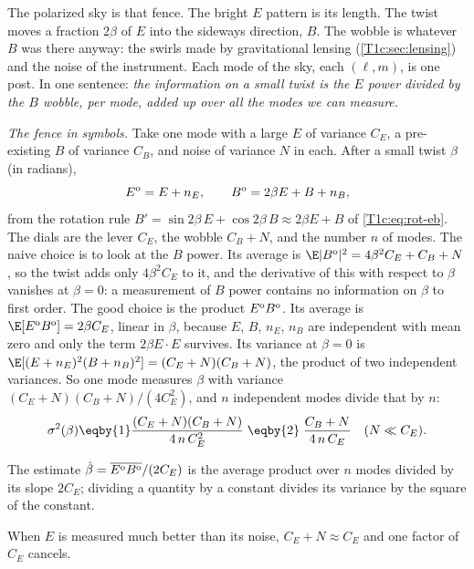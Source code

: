 The polarized sky is that fence. The bright $E$ pattern is its length. The twist moves a fraction $2\beta$ of $E$
into the sideways direction, $B$. The wobble is whatever $B$ was there anyway: the swirls made by gravitational
lensing (\cref{T1c:sec:lensing}) and the noise of the instrument. Each mode of the sky, each $(\ell,m)$, is one
post. In one sentence: \emph{the information on a small twist is the $E$ power divided by the $B$ wobble, per
mode, added up over all the modes we can measure.}

\emph{The fence in symbols.} Take one mode with a large $E$ of variance $C_E$, a pre-existing $B$ of variance
$C_B$, and noise of variance $N$ in each. After a small twist $\beta$ (in radians),
\begin{equation}
  E^{\rm o}=E+n_E,\qquad
  B^{\rm o}=2\beta E+B+n_B ,
  \label{10c:eq:toy}
\end{equation}
from the rotation rule $B'=\sin2\beta\,E+\cos2\beta\,B\approx2\beta E+B$ of \cref{T1c:eq:rot-eb}. The dials are the
lever $C_E$, the wobble $C_B+N$, and the number $n$ of modes. The naive choice is to look at the $B$ power. Its
average is $\E|B^{\rm o}|^2=4\beta^2C_E+C_B+N$, so the twist adds only $4\beta^2C_E$ to it, and the derivative of
this with respect to $\beta$ vanishes at $\beta=0$: a measurement of $B$ power contains no information on $\beta$ to
first order. The good choice is the product $E^{\rm o}B^{\rm o}$. Its average is
$\E[E^{\rm o}B^{\rm o}]=2\beta C_E$, linear in $\beta$, because $E$, $B$, $n_E$, $n_B$ are independent with mean
zero and only the term $2\beta E\cdot E$ survives. Its variance at $\beta=0$ is
$\E[(E+n_E)^2(B+n_B)^2]=(C_E+N)(C_B+N)$, the product of two independent variances. So one mode measures
$\beta$ with variance $(C_E+N)(C_B+N)/(4C_E^2)$, and $n$ independent modes divide that by $n$:
\begin{equation}
  \sigma^2(\beta)\eqby{1}\frac{(C_E+N)(C_B+N)}{4\,n\,C_E^2}
  \;\eqby{2}\;\frac{C_B+N}{4\,n\,C_E}\quad(N\ll C_E).
  \label{10c:eq:toy-sigma}
\end{equation}
\begin{explain}
  \item The estimate $\hat\beta=\overline{E^{\rm o}B^{\rm o}}/(2C_E)$ is the average product over $n$ modes divided
        by its slope $2C_E$; dividing a quantity by a constant divides its variance by the square of the constant.
  \item When $E$ is measured much better than its noise, $C_E+N\approx C_E$ and one factor of $C_E$ cancels.
\end{explain}
